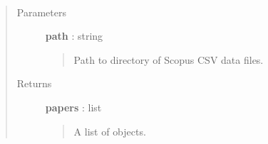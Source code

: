 \documentclass[letterpaper,10pt,english]{sphinxmanual}
\begin{document}
\begin{fulllineitems}
\label{tethne.readers.scopus:tethne.readers.scopus.corpus_from_dir}~\begin{quote}\begin{description}
\item[{Parameters}] \leavevmode
\textbf{path} : string
\begin{quote}

Path to directory of Scopus CSV data files.
\end{quote}

\item[{Returns}] \leavevmode
\textbf{papers} : list
\begin{quote}

A list of {\hyperref[tethne.classes.paper:tethne.classes.paper.Paper]{}} objects.
\end{quote}

\end{description}\end{quote}

\end{fulllineitems}

\end{document}
